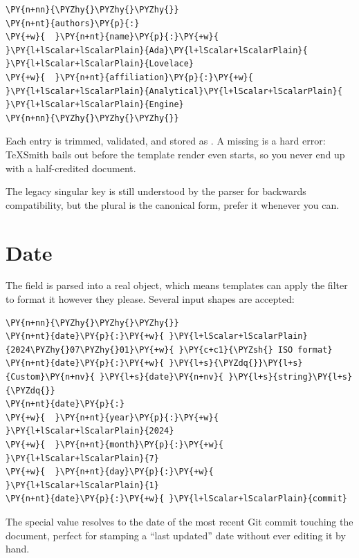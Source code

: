 \documentclass[a4paper,twoside]{article}
\begin{document}
\begin{tscode}[lang=yaml, engine=pygments]
\begin{Verbatim}[commandchars=\\\{\},breaklines, breakanywhere, commandchars=\\\{\}]
\PY{n+nn}{\PYZhy{}\PYZhy{}\PYZhy{}}
\PY{n+nt}{authors}\PY{p}{:}
\PY{+w}{  }\PY{n+nt}{name}\PY{p}{:}\PY{+w}{ }\PY{l+lScalar+lScalarPlain}{Ada}\PY{l+lScalar+lScalarPlain}{ }\PY{l+lScalar+lScalarPlain}{Lovelace}
\PY{+w}{  }\PY{n+nt}{affiliation}\PY{p}{:}\PY{+w}{ }\PY{l+lScalar+lScalarPlain}{Analytical}\PY{l+lScalar+lScalarPlain}{ }\PY{l+lScalar+lScalarPlain}{Engine}
\PY{n+nn}{\PYZhy{}\PYZhy{}\PYZhy{}}
\end{Verbatim}
\end{tscode}
Each entry is trimmed, validated, and stored as . A missing  is a hard error: TeXSmith bails out before the template render even starts, so you never end up with a half-credited document.

The legacy singular  key is still understood by the parser for backwards compatibility, but the plural  is the canonical form, prefer it whenever you can.
\section{Date}
The  field is parsed into a real  object, which means templates can apply the  filter to format it however they please. Several input shapes are accepted:
\begin{tscode}[lang=yaml, engine=pygments]
\begin{Verbatim}[commandchars=\\\{\},breaklines, breakanywhere, commandchars=\\\{\}]
\PY{n+nn}{\PYZhy{}\PYZhy{}\PYZhy{}}
\PY{n+nt}{date}\PY{p}{:}\PY{+w}{ }\PY{l+lScalar+lScalarPlain}{2024\PYZhy{}07\PYZhy{}01}\PY{+w}{ }\PY{c+c1}{\PYZsh{} ISO format}
\PY{n+nt}{date}\PY{p}{:}\PY{+w}{ }\PY{l+s}{\PYZdq{}}\PY{l+s}{Custom}\PY{n+nv}{ }\PY{l+s}{date}\PY{n+nv}{ }\PY{l+s}{string}\PY{l+s}{\PYZdq{}}
\PY{n+nt}{date}\PY{p}{:}
\PY{+w}{  }\PY{n+nt}{year}\PY{p}{:}\PY{+w}{ }\PY{l+lScalar+lScalarPlain}{2024}
\PY{+w}{  }\PY{n+nt}{month}\PY{p}{:}\PY{+w}{ }\PY{l+lScalar+lScalarPlain}{7}
\PY{+w}{  }\PY{n+nt}{day}\PY{p}{:}\PY{+w}{ }\PY{l+lScalar+lScalarPlain}{1}
\PY{n+nt}{date}\PY{p}{:}\PY{+w}{ }\PY{l+lScalar+lScalarPlain}{commit}
\end{Verbatim}
\end{tscode}
The special  value resolves to the date of the most recent Git commit touching the document, perfect for stamping a \enquote{last updated} date without ever editing it by hand.
\end{document}
